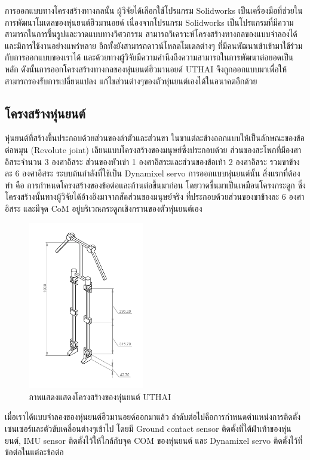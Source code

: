 การออกแบบทางโครงสร้างทางกลนั้น ผู้วิจัยได้เลือกใช้โปรแกรม Solidworks เป็นเครื่องมือที่ช่วยในการพัฒนาโมเดลของหุ่นยนต์ฮิวมานอยด์
เนื่องจากโปรแกรม Solidworks เป็นโปรแกรมที่มีความสามารถในการขึ้นรูปและวาดแบบทางวิศวกรรม
สามารถวิเคราะห์โครงสร้างทางกลของแบบจำลองได้ และมีการใช้งานอย่างแพร่หลาย อีกทั้งยังสามารถดาวน์โหลดโมเดลต่างๆ
ที่มีคนพัฒนาเข้าเข้ามาใช้ร่วมกับการออกแบบของเราได้ และด้วยทางผู้วิจัยมีความคำนึงถึงความสามารถในการพัฒนาต่อยอดเป็นหลัก
ดังนั้นการออกโครงสร้างทางกลของหุ่นยนต์ฮิวมานอยด์ UTHAI จึงถูกออกแบบมาเพื่อให้สามารถรองรับการเปลี่ยนแปลง
แก้ไขส่วนต่างๆของตัวหุ่นยนต์เองได้ในอนาคตอีกด้วย

\subsection{โครงสร้างหุ่นยนต์}
หุ่นยนต์ที่สร้างขึ้นประกอบด้วยส่วนของลำตัวและส่วนขา ในขาแต่ละข้างออกแบบให้เป็นลักษณะของข้อต่อหมุน (Revolute joint)
เลียนแบบโครงสร้างของมนุษย์ซึ่งประกอบด้วย ส่วนของสะโพกที่มีองศาอิสระจำนวน 3 องศาอิสระ ส่วนของหัวเข่า 1
องศาอิสระและส่วนของข้อเท้า 2 องศาอิสระ รวมขาข้างละ 6 องศาอิสระ ระบบต้นกำลังที่ใช้เป็น Dynamixel servo การออกแบบหุ่นยนต์นั้น
สิ่งแรกที่ต้องทำ คือ การกำหนดโครงสร้างของข้อต่อและก้านต่อขึ้นมาก่อน โดยวาดขึ้นมาเป็นเหมือนโครงกระดูก
ซึ่งโครงสร้างนั้นทางผู้วิจัยได้อ้างอิงมาจากสัดส่วนของมนุษย์จริง ที่ประกอบด้วยส่วนของขาข้างละ 6 องศาอิสระ และมีจุด CoM
อยู่บริเวณกระดูกเชิงกรานของตัวหุ่นยนต์เอง
\begin{figure}[ht]
    \centering
    \includegraphics[width=0.45\textwidth]{chapter3/images/uthai_structure1.png}
    \caption{ภาพแสดงแสดงโครงสร้างของหุ่นยนต์ UTHAI}
    \label{fig:uthai_structure1}
\end{figure}

เมื่อเราได้แบบจำลองของหุ่นยนต์ฮิวมานอยด์ออกมาแล้ว ลำดับต่อไปคือการกำหนดตำแหน่งการติดตั้งเซนเซอร์และตัวขับเคลื่อนต่างๆเข้าไป
โดยมี Ground contact sensor ติดตั้งที่ใต้ฝ่าเท้าของหุ่นยนต์, IMU sensor ติดตั้งไว้ให้ใกล้กับจุด COM ของหุ่นยนต์ และ Dynamixel servo
ติดตั้งไว้ที่ข้อต่อในแต่ละข้อต่อ

